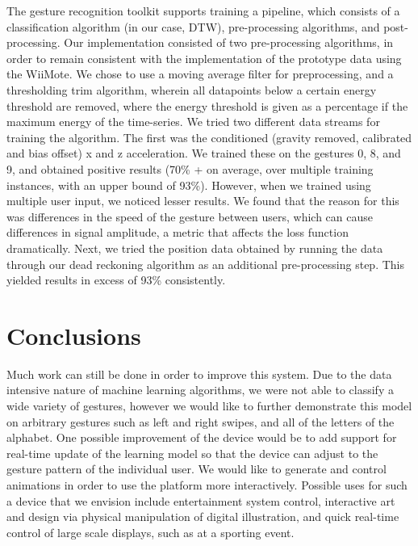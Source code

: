 \documentclass{sig-alternate-05-2015}
\begin{document}
The gesture recognition toolkit supports training a pipeline, which consists of a classification algorithm (in our case, DTW), pre-processing algorithms, and post-processing. Our implementation consisted of two pre-processing algorithms, in order to remain consistent with the implementation of the prototype data using the WiiMote. We chose to use a moving average filter for preprocessing, and a thresholding trim algorithm, wherein all datapoints below a certain energy threshold are removed, where the energy threshold is given as a percentage if the maximum energy of the time-series. We tried two different data streams for training the algorithm. The first was the conditioned (gravity removed, calibrated and bias offset) x and z acceleration. We trained these on the gestures 0, 8, and 9, and obtained positive results (70\% + on average, over multiple training instances, with an upper bound of 93\%). However, when we trained using multiple user input, we noticed lesser results. We found that the reason for this was differences in the speed of the gesture between users, which can cause differences in signal amplitude, a metric that affects the loss function dramatically. Next, we tried the position data obtained by running the data through our dead reckoning algorithm as an additional pre-processing step. This yielded results in excess of 93\% consistently.

\section{Conclusions}
Much work can still be done in order to improve this system. Due to the data intensive nature of machine learning algorithms, we were not able to classify a wide variety of gestures, however we would like to further demonstrate this model on arbitrary gestures such as left and right swipes, and all of the letters of the alphabet. One possible improvement of the device would be to add support for real-time update of the learning model so that the device can adjust to the gesture pattern of the individual user. We would like to generate and control animations in order to use the platform more interactively. Possible uses for such a device that we envision include entertainment system control, interactive art and design via physical manipulation of digital illustration, and quick real-time control of large scale displays, such as at a sporting event.
\end{document}
